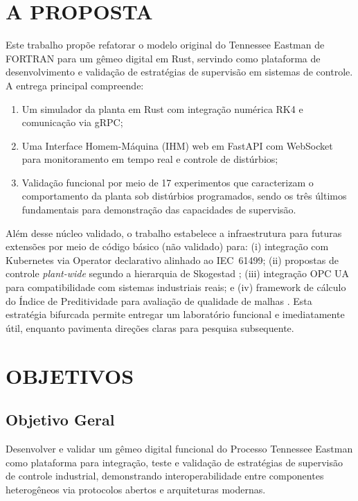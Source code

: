\section{A PROPOSTA}
\label{sec:proposta}

Este trabalho propõe refatorar o modelo original do Tennessee Eastman de FORTRAN para um gêmeo digital em Rust, servindo como plataforma de desenvolvimento e validação de estratégias de supervisão em sistemas de controle. A entrega principal compreende:

\begin{enumerate}
  \item Um simulador da planta em Rust com integração numérica RK4 e comunicação via gRPC;
  \item Uma Interface Homem-Máquina (IHM) web em FastAPI com WebSocket para monitoramento em tempo real e controle de distúrbios;
  \item Validação funcional por meio de 17 experimentos que caracterizam o comportamento da planta sob distúrbios programados, sendo os três últimos fundamentais para demonstração das capacidades de supervisão.
\end{enumerate}

Além desse núcleo validado, o trabalho estabelece a infraestrutura para futuras extensões por meio de código básico (não validado) para: (i) integração com Kubernetes via Operator declarativo alinhado ao IEC~61499; (ii) propostas de controle \textit{plant-wide} segundo a hierarquia de Skogestad \cite{Skogestad2004}; (iii) integração OPC UA para compatibilidade com sistemas industriais reais; e (iv) framework de cálculo do Índice de Preditividade para avaliação de qualidade de malhas \cite{Bradu2018}. Esta estratégia bifurcada permite entregar um laboratório funcional e imediatamente útil, enquanto pavimenta direções claras para pesquisa subsequente.

\section{OBJETIVOS}
\label{sec:objetivos}

\subsection{Objetivo Geral}

Desenvolver e validar um gêmeo digital funcional do Processo Tennessee Eastman como plataforma para integração, teste e validação de estratégias de supervisão de controle industrial, demonstrando interoperabilidade entre componentes heterogêneos via protocolos abertos e arquiteturas modernas.

